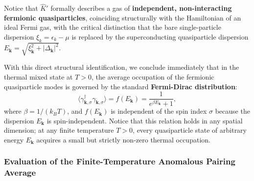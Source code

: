 \begin{remark}
    Notice that \( \hat{K}' \) formally describes a gas of \textbf{independent, non-interacting fermionic quasiparticles}, coinciding structurally with the Hamiltonian of an ideal Fermi gas, with the critical distinction that the bare single-particle dispersion \( \xi_k = \epsilon_k - \mu \) is replaced by the superconducting quasiparticle dispersion \( E_{\mathbf{k}} = \sqrt{\xi_{\mathbf{k}}^2 + |\Delta_{\mathbf{k}}|^2} \).
\end{remark}

With this direct structural identification, we conclude immediately that in the thermal mixed state at \( T > 0 \), the average occupation of the fermionic quasiparticle modes is governed by the standard \textbf{Fermi-Dirac distribution}:
\[
    \langle \gamma_{\mathbf{k},\sigma}^\dagger \gamma_{\mathbf{k},\sigma} \rangle = f(E_{\mathbf{k}}) = \frac{1}{e^{\beta E_{\mathbf{k}}} + 1},
\]
where \( \beta = 1/(k_B T) \), and \( f(E_{\mathbf{k}}) \) is independent of the spin index \( \sigma \) because the dispersion \( E_{\mathbf{k}} \) is spin-independent. Notice that this relation holds in any spatial dimension; at any finite temperature \( T > 0 \), every quasiparticle state of arbitrary energy \( E_{\mathbf{k}} \) acquires a small but strictly non-zero thermal occupation.

\subsubsection{Evaluation of the Finite-Temperature Anomalous Pairing Average}

